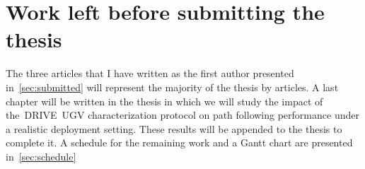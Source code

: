 \documentclass[12pt,letterpaper,oneside]{article}
\begin{document}
\section{Work left before submitting the thesis}
\label{sec:future_work}

The three articles that I have written as the first author presented in~\autoref{sec:submitted} will represent the majority of the thesis by articles.
A last chapter will be written in the thesis in which we will study the impact of the~\ac{DRIVE}~\ac{UGV} characterization protocol on path following performance under a realistic deployment setting.
These results will be appended to the thesis to complete it.
A schedule for the remaining work and a Gantt chart are presented in~\autoref{sec:schedule}

\end{document}
